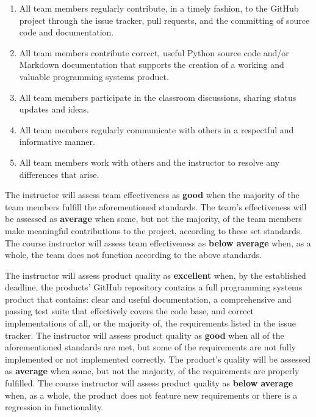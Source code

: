 \documentclass[11pt]{article}
\begin{document}
\begin{enumerate}
  \setlength{\itemsep}{0pt}

  \item All team members regularly contribute, in a timely fashion, to the GitHub project through the issue tracker,
    pull requests, and the committing of source code and documentation.

  \item All team members contribute correct, useful Python source code and/or Markdown documentation that supports the
    creation of a working and valuable programming systems product.

  \item All team members participate in the classroom discussions, sharing status updates and ideas.

  \item All team members regularly communicate with others in a respectful and informative manner.

  \item All team members work with others and the instructor to resolve any differences that arise.

\end{enumerate}

\vspace*{-.5em}

The instructor will assess team effectiveness as {\bf good} when the majority of the team members fulfill the
aforementioned standards. The team's effectiveness will be assessed as {\bf average} when some, but not the majority, of
the team members make meaningful contributions to the project, according to these set standards. The course instructor
will assess team effectiveness as {\bf below average} when, as a whole, the team does not function according to the
above standards.

The instructor will assess product quality as {\bf excellent} when, by the established deadline, the products' GitHub
repository contains a full programming systems product that contains: clear and useful documentation, a comprehensive
and passing test suite that effectively covers the code base, and correct implementations of all, or the majority of,
the requirements listed in the issue tracker. The instructor will assess product quality as {\bf good} when all of the
aforementioned standards are met, but some of the requirements are not fully implemented or not implemented correctly.
The product's quality will be assessed as {\bf average} when some, but not the majority, of the requirements are
properly fulfilled. The course instructor will assess product quality as {\bf below average} when, as a whole, the
product does not feature new requirements or there is a regression in functionality.
\end{document}

